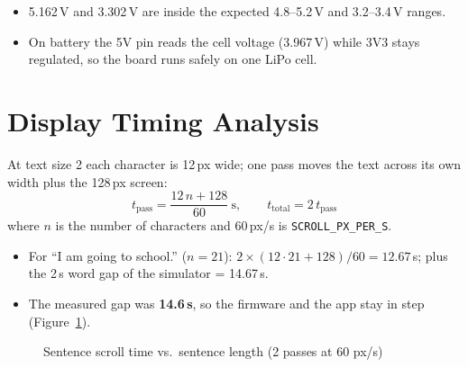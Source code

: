 \documentclass[12pt,a4paper]{report}
\begin{document}
\begin{itemize}
  \item 5.162\,V and 3.302\,V are inside the expected 4.8--5.2\,V and 3.2--3.4\,V ranges.
  \item On battery the 5V pin reads the cell voltage (3.967\,V) while 3V3 stays regulated, so the board runs safely on one LiPo cell.
\end{itemize}

\section{Display Timing Analysis}
At text size 2 each character is 12\,px wide; one pass moves the text across its own width plus the 128\,px screen:
\begin{equation}
t_{\text{pass}} = \frac{12\,n + 128}{60}\ \text{s}, \qquad t_{\text{total}} = 2\,t_{\text{pass}}
\label{eq:scroll}
\end{equation}
where $n$ is the number of characters and 60\,px/s is \texttt{SCROLL\_PX\_PER\_S}.

\begin{itemize}
  \item For ``I am going to school.'' ($n = 21$): $2 \times (12 \cdot 21 + 128)/60 = 12.67$\,s; plus the 2\,s word gap of the simulator = 14.67\,s.
  \item The measured gap was \textbf{14.6\,s}, so the firmware and the app stay in step (Figure~\ref{fig:scroll}).
\end{itemize}

\begin{figure}[H]
\centering
{}
\caption{Sentence scroll time vs.\ sentence length (2 passes at 60 px/s)}
\label{fig:scroll}
\end{figure}
\end{document}
